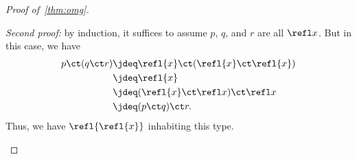 \begin{proof}[Proof of~\cref{thm:omg}]
\begin{enumerate}
    \mentalpause

    \noindent \emph{Second proof:} by induction, it suffices to assume $p$, $q$, and $r$ are all $\refl x$.
    But in this case, we have
    \begin{align*}
      p\ct (q\ct r)
      &\jdeq \refl{x}\ct(\refl{x}\ct \refl{x})\\
      &\jdeq \refl{x}\\
      &\jdeq (\refl{x}\ct \refl x)\ct \refl x\\
      &\jdeq (p\ct q)\ct r.
    \end{align*}
    Thus, we have $\refl{\refl{x}}$ inhabiting this type. \qedhere
  \end{enumerate}
\end{proof}

